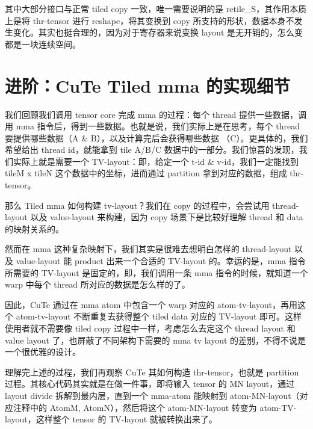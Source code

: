 其中大部分接口与正常 tiled copy 一致，唯一需要说明的是 retile\_S，其作用本质上是将 thr-tensor 进行 reshape，将其变换到 copy 所支持的形状，数据本身不发生变化。其实也挺合理的，因为对于寄存器来说变换 layout 是无开销的，怎么变都是一块连续空间。

\section{进阶：CuTe Tiled mma 的实现细节}

我们回顾我们调用 tensor core 完成 mma 的过程：每个 thread 提供一些数据，调用 mma 指令后，得到一些数据。也就是说，我们实际上是在思考，每个 thread 要提供哪些数据（A \& B），以及计算完后会获得哪些数据 （C）。更具体的，我们希望给出 thread id，就能拿到 tile A/B/C 数据中的一部分。我们惊喜的发现，我们实际上就是需要一个 TV-layout：即，给定一个 t-id \& v-id，我们一定能找到 tileM x tileN 这个数据中的坐标，进而通过 partition 拿到对应的数据，组成 thr-tensor。

那么 Tiled mma 如何构建 tv-layout？我们在 copy 的过程中，会尝试用 thread-layout 以及 value-layout 来构建，因为 copy 场景下是比较好理解 thread 和 data 的映射关系的。

然而在 mma 这种复杂映射下，我们其实是很难去想明白怎样的 thread-layout 以及 value-layout 能 product 出来一个合适的 TV-layout 的。幸运的是，mma 指令所需要的 TV-layout 是固定的，即，我们调用一条 mma 指令的时候，就知道一个 warp 中每个 thread 所对应的数据是怎么样的了。

因此，CuTe 通过在 mma atom 中包含一个 warp 对应的 atom-tv-layout，再用这个 atom-tv-layout 不断重复去获得整个 tiled data 对应的 TV-layout 即可。这样使用者就不需要像 tiled copy 过程中一样，考虑怎么去定这个 thread layout 和 value layout 了，也屏蔽了不同架构下需要的 mma tv layout 的差别，不得不说是一个很优雅的设计。

理解完上述的过程，我们再观察 CuTe 其如何构造 thr-tensor，也就是 partition 过程。其核心代码其实就是在做一件事，即将输入 tensor 的 MN layout，通过 layout divide 拆解到最内层，直到一个 mma-atom 能映射到 atom-MN-layout（对应注释中的 AtomM, AtomN），然后将这个 atom-MN-layout 转变为 atom-TV-layout，这样整个 tensor 的 TV-layout 就被转换出来了。

